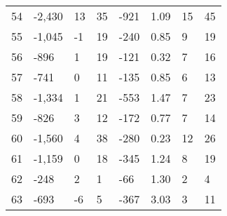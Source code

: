 \begin{appendices}
\begin{longtable}[c]{@{}llllllll@{}}
	54                       & -2,430                        & 13                           & 35                           & -921                     & 1.09                    & 15                   & 45                      \\
	55                       & -1,045                        & -1                           & 19                           & -240                     & 0.85                    & 9                    & 19                      \\
	56                       & -896                          & 1                            & 19                           & -121                     & 0.32                    & 7                    & 16                      \\
	57                       & -741                          & 0                            & 11                           & -135                     & 0.85                    & 6                    & 13                      \\
	58                       & -1,334                        & 1                            & 21                           & -553                     & 1.47                    & 7                    & 23                      \\
	59                       & -826                          & 3                            & 12                           & -172                     & 0.77                    & 7                    & 14                      \\
	60                       & -1,560                        & 4                            & 38                           & -280                     & 0.23                    & 12                   & 26                      \\
	61                       & -1,159                        & 0                            & 18                           & -345                     & 1.24                    & 8                    & 19                      \\
	62                       & -248                          & 2                            & 1                            & -66                      & 1.30                    & 2                    & 4                       \\
	63                       & -693                          & -6                           & 5                            & -367                     & 3.03                    & 3                    & 11                      \\

\end{longtable}
\end{appendices}

